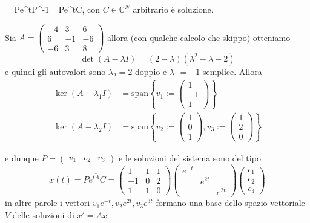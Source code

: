 = Pe^{t}P^{-1}\xi = Pe^{t}C\), con \(C \in \mathbb{C}^{N}\)
arbitrario è soluzione.
\begin{example}
    Sia \(A = \begin{pmatrix}
        -4 & 3 & 6 \\
        6 & -1 & -6 \\
        -6 & 3 & 8
    \end{pmatrix}\) allora (con qualche calcolo che skippo) otteniamo
    \[
      \det {(A -  \lambda I)} = {(2 - \lambda)}{(\lambda^2 - \lambda - 2)}
    \]
    e quindi gli autovalori sono \(\lambda_{2} = 2\) doppio e \(\lambda_{1} = -1\)
    semplice.
    Allora 
    \begin{align*}
        \ker {(A - \lambda_{1}I)} &= \mathrm{span}\left\{ v_{1} := \begin{pmatrix}
          1 \\
          -1 \\
          1
  \end{pmatrix} \right\} \\
                \ker {(A - \lambda_{2}I)} &= \mathrm{span}\left\{
  v_{2} := \begin{pmatrix}
      1 \\
      0 \\
      1
      \end{pmatrix},v_{3} := \begin{pmatrix} 
      1 \\
      2 \\
      0
\end{pmatrix} \right\}
\end{align*}

e dunque \(P = \begin{pmatrix} v_{1} & v_{2} & v_{3} \end{pmatrix}\) e le soluzioni del sistema sono del tipo
    \[
     x{(t)} = Pe^{t\tilde{A}}C = \begin{pmatrix}
         1 & 1 & 1 \\
         -1 & 0 & 2 \\
         1 & 1 & 0 
         \end{pmatrix} \begin{pmatrix}
         e^{-t} &  &  \\
         & e^{2t} &  \\
         &  & e^{2t}
         \end{pmatrix} \begin{pmatrix}
         c_{1} \\
         c_{2} \\
         c_{3}
     \end{pmatrix}
    \]
in altre parole i vettori \(v_{1}e^{-t}, v_{2}e^{2t}, v_{3}e^{3t}\) formano una
base dello spazio vettoriale \(V\) delle soluzioni di \(x' = Ax\) 
\end{example}
